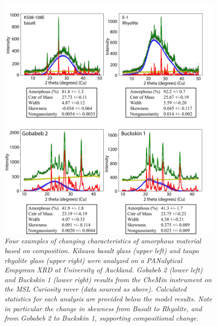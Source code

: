 \documentclass[preprint, a4paper]{elsarticle}
\begin{document}
\begin{figure}[!ht]
\centering
\includegraphics[width=1\textwidth]{figures/volcanic_glasses.jpg}
\caption{\it Four examples of changing characteristics of amorphous material based on composition. Kilauea basalt glass (upper left) and taupo rhyolite glass (upper right) were analyzed on a PANalytical Empyrean XRD at University of Auckland. Gobabeb 2 (lower left) and Buckskin 1 (lower right) results from the CheMin instrument on the MSL Curiosity rover (data sourced as above). Calculated statistics for each analysis are provided below the model results. Note in particular the change in skewness from Basalt to Rhyolite, and from Gobabeb 2 to Buckskin 1, supporting compositional change.\label{fig:volcanic_glasses}}
\end{figure}
\end{document}
